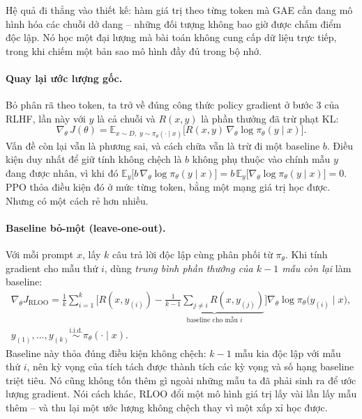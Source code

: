 Hệ quả đi thẳng vào thiết kế: hàm giá trị theo từng token mà GAE cần đang mô hình hóa các chuỗi dở dang -- những đối tượng không bao giờ được chấm điểm độc lập. Nó học một đại lượng mà bài toán không cung cấp dữ liệu trực tiếp, trong khi chiếm một bản sao mô hình đầy đủ trong bộ nhớ.

\paragraph{Quay lại ước lượng gốc.}
Bỏ phân rã theo token, ta trở về đúng công thức policy gradient ở bước 3 của RLHF, lần này với \( y \) là cả chuỗi và \( R(x,y) \) là phần thưởng đã trừ phạt KL:
\[
    \nabla_{\theta}\, J(\theta)
    = \mathbb{E}_{x \sim D,\; y \sim \pi_{\theta}(\cdot \mid x)}
    \big[ R(x,y)\, \nabla_{\theta}\log \pi_{\theta}(y \mid x) \big].
\]
Vấn đề còn lại vẫn là phương sai, và cách chữa vẫn là trừ đi một baseline \( b \). Điều kiện duy nhất để giữ tính không chệch là \( b \) không phụ thuộc vào chính mẫu \( y \) đang được nhân, vì khi đó \( \mathbb{E}_y\big[ b\, \nabla_{\theta}\log\pi_{\theta}(y \mid x) \big] = b\, \mathbb{E}_y\big[\nabla_{\theta}\log\pi_{\theta}(y \mid x)\big] = 0 \). PPO thỏa điều kiện đó ở mức từng token, bằng một mạng giá trị học được. Nhưng có một cách rẻ hơn nhiều.

\paragraph{Baseline bỏ-một (leave-one-out).}
Với mỗi prompt \( x \), lấy \( k \) câu trả lời độc lập cùng phân phối từ \( \pi_{\theta} \). Khi tính gradient cho mẫu thứ \( i \), dùng \emph{trung bình phần thưởng của \( k-1 \) mẫu còn lại} làm baseline:
\[
\begin{gathered}
    \nabla_{\theta} J_{\text{RLOO}}
    = \frac{1}{k}\sum_{i=1}^{k}
    \Big[
        R(x, y_{(i)}) - \underbrace{\frac{1}{k-1}\sum_{j \neq i} R(x, y_{(j)})}_{\text{baseline cho mẫu } i}
    \Big]
    \nabla_{\theta} \log \pi_{\theta}\big(y_{(i)} \mid x\big),
    \\[4pt]
    y_{(1)}, \dots, y_{(k)} \overset{\text{i.i.d.}}{\sim} \pi_{\theta}(\cdot \mid x).
\end{gathered}
\]
Baseline này thỏa đúng điều kiện không chệch: \( k-1 \) mẫu kia độc lập với mẫu thứ \( i \), nên kỳ vọng của tích tách được thành tích các kỳ vọng và số hạng baseline triệt tiêu. Nó cũng không tốn thêm gì ngoài những mẫu ta đã phải sinh ra để ước lượng gradient. Nói cách khác, RLOO đổi một mô hình giá trị lấy vài lần lấy mẫu thêm -- và thu lại một ước lượng không chệch thay vì một xấp xỉ học được.

